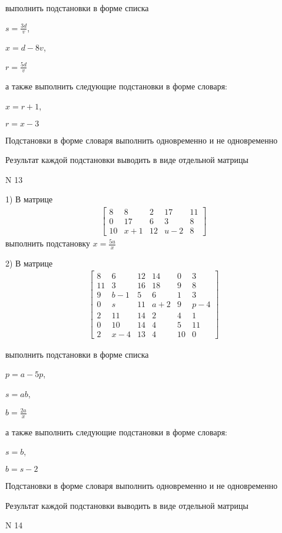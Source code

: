 \documentclass[11pt]{report}
\begin{document}
выполнить подстановки в форме списка

$s=\frac{3 d}{v}$,

$x=d - 8 v$,

$r=\frac{5 d}{v}$

а также выполнить следующие подстановки в форме словаря:

$x=r + 1$,

$r=x - 3$


    Подстановки в форме словаря выполнить одновременно и не одновременно


    Результат каждой подстановки выводить в виде отдельной матрицы

\newpage
N 13


    1) В матрице
\begin{align*}
\left[\begin{matrix}8 & 8 & 2 & 17 & 11\\0 & 17 & 6 & 3 & 8\\10 & x + 1 & 12 & u - 2 & 8\end{matrix}\right]
\end{align*}
выполнить подстановку $x=\frac{5 u}{x}$


    2) В матрице
\begin{align*}
\left[\begin{matrix}8 & 6 & 12 & 14 & 0 & 3\\11 & 3 & 16 & 18 & 9 & 8\\9 & b - 1 & 5 & 6 & 1 & 3\\0 & s & 11 & a + 2 & 9 & p - 4\\2 & 11 & 14 & 2 & 4 & 1\\0 & 10 & 14 & 4 & 5 & 11\\2 & x - 4 & 13 & 4 & 10 & 0\end{matrix}\right]
\end{align*}

выполнить подстановки в форме списка

$p=a - 5 p$,

$s=a b$,

$b=\frac{2 a}{x}$

а также выполнить следующие подстановки в форме словаря:

$s=b$,

$b=s - 2$


    Подстановки в форме словаря выполнить одновременно и не одновременно


    Результат каждой подстановки выводить в виде отдельной матрицы

\newpage
N 14
\end{document}
